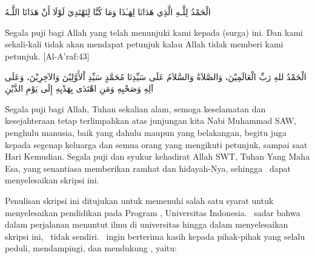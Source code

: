 \chapter*{\kataPengantar}

\begin{arabtex}الْحَمْدُ لِلَّـهِ الَّذِي هَدَانَا لِهَـٰذَا وَمَا كُنَّا لِنَهْتَدِيَ لَوْلَا أَنْ هَدَانَا اللَّـهُ\end{arabtex} \f{Segala puji bagi Allah yang telah menunjuki kami kepada (surga) ini. Dan kami sekali-kali tidak akan mendapat petunjuk kalau Allah tidak memberi kami petunjuk. [Al-A'raf:43]}\begin{arabtex}الْحَمْدُ للهِ رَبِّ الْعَالَمِيْنَ، وَالصَّلاَةُ وَالسَّلاَمُ عَلَى سَيِّدِنَا مُحَمَّدٍ سَيِّدِ اْلأَوَّلِيْنَ وَالآخِرِيْنَ، وَعَلَى آلِهِ وَصَحْبِهِ وَمَنِ اهْتَدَى بِهَدْيِهِ إِلَى يَوْمِ الدَّيْنِ\end{arabtex} \f{Segala puji bagi Allah, Tuhan sekalian alam, semoga keselamatan dan kesejahteraan tetap terlimpahkan atas junjungan kita Nabi Muhammad SAW, penghulu manusia, baik yang dahulu maupun yang belakangan, begitu juga kepada segenap keluarga dan semua orang yang mengikuti petunjuk, sampai saat Hari Kemudian.} Segala puji dan syukur kehadirat Allah SWT, Tuhan Yang Maha Esa, yang senantiasa memberikan ramhat dan hidayah-Nya, sehingga \saya~dapat menyelesaikan skripsi ini.

Penulisan skripsi ini ditujukan untuk memenuhi salah satu syarat untuk menyelesaikan pendidikan pada Program \gelar, Universitas Indonesia. \Saya~sadar bahwa dalam perjalanan menuntut ilmu di universitas hingga dalam menyelesaikan skripsi ini, \saya~tidak sendiri. \Saya~ingin berterima kasih kepada pihak-pihak yang selalu peduli, mendampingi, dan mendukung \saya, yaitu:


